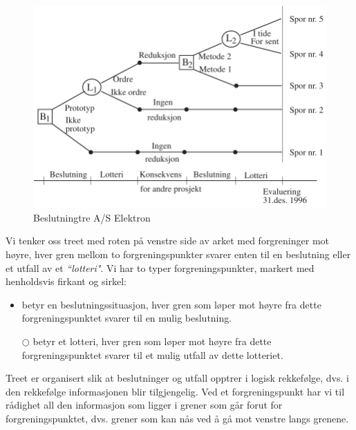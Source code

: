 {{\begin{figure}[ht]
\centering
 \includegraphics[scale=0.8]{figurer/fig16_1.pdf} 
\caption{Beslutningtre A/S Elektron}
	\label{fig:AS_Elektron}
\end{figure}
Vi tenker oss treet med roten på venstre side av arket med 
forgreninger mot høyre, hver gren mellom to forgreningspunkter svarer
enten til en beslutning eller et utfall av et \emph{``lotteri"}.  Vi har to
typer forgreningspunkter, markert med henholdsvis firkant og sirkel:

\begin{itemize}
\item betyr en beslutningssituasjon, hver gren som løper mot %
      høyre fra dette forgreningspunktet svarer til en mulig beslutning.\\
\item[$\bigcirc$] betyr et lotteri, hver gren som løper mot høyre fra
      dette for\-gre\-nings\-punktet svarer til et mulig utfall av dette lotteriet.
\end{itemize}

Treet er organisert slik at beslutninger og utfall opptrer i logisk 
rekke\-følge, dvs. i den rekkefølge informasjonen blir tilgjengelig.
Ved et for\-grenings\-punkt har vi til rådighet all den informasjon som
ligger i grener som går forut for forgreningspunktet, dvs. grener
som kan nås ved å gå mot venstre langs grenene.

}}
